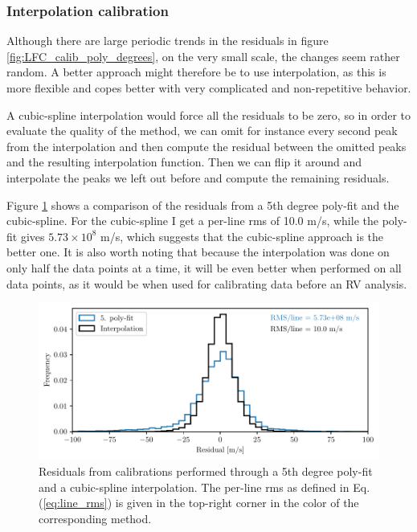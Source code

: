     \subsubsection{Interpolation calibration}
    Although there are large periodic trends in the residuals in figure \ref{fig:LFC_calib_poly_degrees}, on the very small scale, the changes seem rather random. A better approach might therefore be to use interpolation, as this is more flexible and copes better with very complicated and non-repetitive behavior.
    
    A cubic-spline interpolation would force all the residuals to be zero, so in order to evaluate the quality of the method, we can omit for instance every second peak from the interpolation and then compute the residual between the omitted peaks and the resulting interpolation function. Then we can flip it around and interpolate the peaks we left out before and compute the remaining residuals. 

    Figure \ref{fig:calib_poly_vs_interp} shows a comparison of the residuals from a 5th degree poly-fit and the cubic-spline. For the cubic-spline I get a per-line rms of 10.0 m/s, while the poly-fit gives $5.73 \times 10^8$ m/s, which suggests that the cubic-spline approach is the better one. It is also worth noting that because the interpolation was done on only half the data points at a time, it will be even better when performed on all data points, as it would be when used for calibrating data before an RV analysis.

    \begin{figure}%
        \begin{wide}  
            \includegraphics[width=\textwidth]{figures/calib/hist_peak_residuals_poly_and_interp.pdf}
            \caption{Residuals from calibrations performed through a 5th degree poly-fit and a cubic-spline interpolation. The per-line rms as defined in Eq. (\ref{eq:line_rms}) is given in the top-right corner in the color of the corresponding method.}
            \label{fig:calib_poly_vs_interp}
        \end{wide}
    \end{figure}

